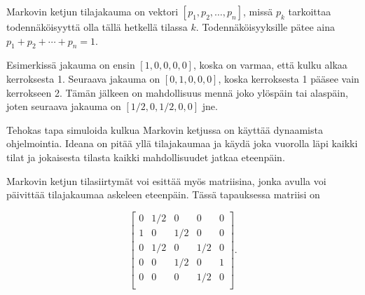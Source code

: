 \begin{center}
\end{center}

Markovin ketjun tilajakauma on vektori
$[p_1,p_2,\ldots,p_n]$, missä $p_k$ tarkoittaa
todennäköisyyttä olla tällä hetkellä tilassa $k$.
Todennäköisyyksille pätee aina $p_1+p_2+\cdots+p_n=1$.

Esimerkissä jakauma on ensin $[1,0,0,0,0]$,
koska on varmaa, että kulku alkaa kerroksesta 1.
Seuraava jakauma on $[0,1,0,0,0]$,
koska kerroksesta 1 pääsee vain kerrokseen 2.
Tämän jälkeen on mahdollisuus mennä joko ylöspäin
tai alaspäin, joten seuraava jakauma on $[1/2,0,1/2,0,0]$ jne.

Tehokas tapa simuloida kulkua Markovin ketjussa
on käyttää dynaamista ohjelmointia.
Ideana on pitää yllä tilajakaumaa
ja käydä joka vuorolla läpi kaikki tilat
ja jokaisesta tilasta kaikki mahdollisuudet jatkaa eteenpäin.

Markovin ketjun tilasiirtymät voi esittää myös matriisina,
jonka avulla voi päivittää tilajakaumaa askeleen eteenpäin.
Tässä tapauksessa matriisi on

\[ 
 \begin{bmatrix}
  0 & 1/2 & 0 & 0 & 0 \\
  1 & 0 & 1/2 & 0 & 0 \\
  0 & 1/2 & 0 & 1/2 & 0 \\
  0 & 0 & 1/2 & 0 & 1 \\
  0 & 0 & 0 & 1/2 & 0 \\
 \end{bmatrix}.
\]

